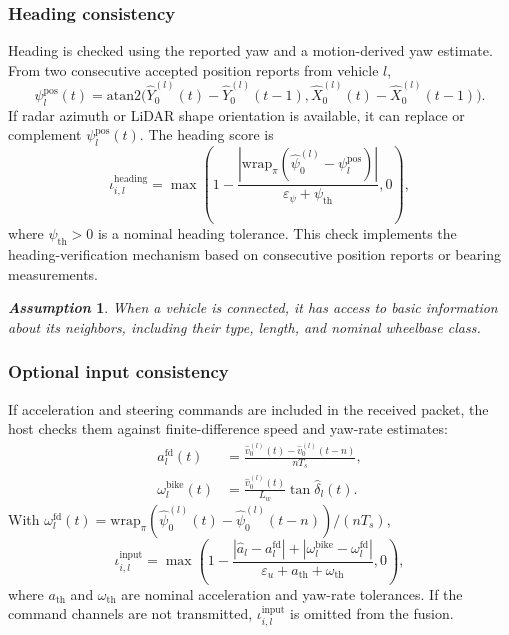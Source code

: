 \documentclass[letterpaper,journal]{IEEEtran}
\newtheorem{assumption}{\it Assumption}%
\begin{document}
\subsubsection{Heading consistency}
Heading is checked using the reported yaw and a motion-derived yaw estimate. From two consecutive accepted position reports from vehicle $l$,
\begin{equation*}
    \psi_{l}^{\mathrm{pos}}(t)=
    \mathrm{atan2}\big(\hat Y_0^{(l)}(t)-\hat Y_0^{(l)}(t-1),
    \hat X_0^{(l)}(t)-\hat X_0^{(l)}(t-1)\big).
\end{equation*}
If radar azimuth or LiDAR shape orientation is available, it can replace or complement $\psi_l^{\mathrm{pos}}(t)$. The heading score is
\begin{equation*}
    \iota_{i,l}^{\text{heading}} =
    \max\left(
    1-\frac{\left|\mathrm{wrap}_{\pi}(\hat{\psi}_0^{(l)}-\psi_l^{\mathrm{pos}})\right|}
    {\varepsilon_{\psi}+\psi_{\mathrm{th}}},
    0
    \right),
\end{equation*}
where $\psi_{\mathrm{th}}>0$ is a nominal heading tolerance. This check implements the heading-verification mechanism based on consecutive position reports or bearing measurements.
\begin{assumption}\label{assum_connect}
When a vehicle is connected, it has access to basic information about its neighbors, including their type, length, and nominal wheelbase class.
\end{assumption}

\subsubsection{Optional input consistency}
If acceleration and steering commands are included in the received packet, the host checks them against finite-difference speed and yaw-rate estimates:
\begin{align*}
    a_{l}^{\mathrm{fd}}(t)
    &=\frac{\hat v_0^{(l)}(t)-\hat v_0^{(l)}(t-n)}{nT_s},\\
    \omega_l^{\mathrm{bike}}(t)
    &=\frac{\hat v_0^{(l)}(t)}{L_w}\tan\hat\delta_l(t).
\end{align*}
With $\omega_l^{\mathrm{fd}}(t)=\mathrm{wrap}_{\pi}(\hat\psi_0^{(l)}(t)-\hat\psi_0^{(l)}(t-n))/(nT_s)$,
\begin{equation*}
    \iota_{i,l}^{\text{input}} =
    \max\left(
    1 -
    \frac{|\hat a_l-a_l^{\mathrm{fd}}|+|\omega_l^{\mathrm{bike}}-\omega_l^{\mathrm{fd}}|}
    {\varepsilon_u+a_{\mathrm{th}}+\omega_{\mathrm{th}}},
    0
    \right),
\end{equation*}
where $a_{\mathrm{th}}$ and $\omega_{\mathrm{th}}$ are nominal acceleration and yaw-rate tolerances. If the command channels are not transmitted, $\iota_{i,l}^{\text{input}}$ is omitted from the fusion.
\end{document}
